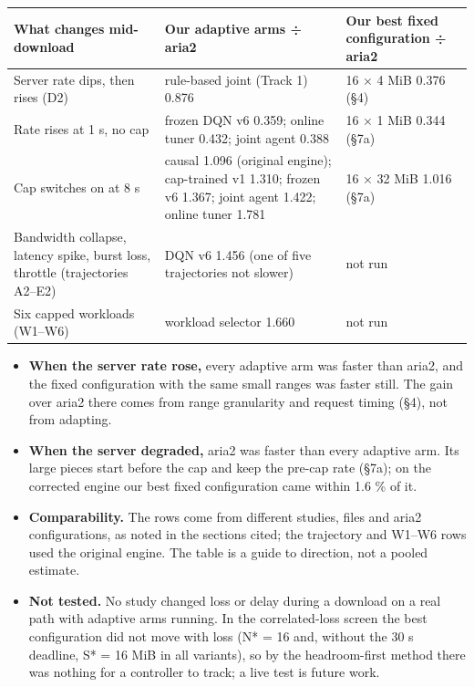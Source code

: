 \documentclass{ieeeaccess}
\begin{document}
\begin{table}[!t]\centering\footnotesize
\begin{tabularx}{\textwidth}{@{}LLL@{}}
\toprule
\textbf{What changes mid-download} & \textbf{Our adaptive arms ÷ aria2} & \textbf{Our best fixed configuration ÷ aria2}\\
\midrule
Server rate dips, then rises (D2) & rule-based joint (Track 1) 0.876 & 16 × 4 MiB 0.376 (§4)\\
Rate rises at 1 s, no cap & frozen DQN v6 0.359; online tuner 0.432; joint agent 0.388 & 16 × 1 MiB 0.344 (§7a)\\
Cap switches on at 8 s & causal 1.096 (original engine); cap-trained v1 1.310; frozen v6 1.367; joint agent 1.422; online tuner 1.781 & 16 × 32 MiB 1.016 (§7a)\\
Bandwidth collapse, latency spike, burst loss, throttle (trajectories A2–E2) & DQN v6 1.456 (one of five trajectories not slower) & not run\\
Six capped workloads (W1–W6) & workload selector 1.660 & not run\\
\bottomrule
\end{tabularx}
\end{table}


\begin{itemize}
\item \textbf{When the server rate rose,} every adaptive arm was faster than aria2, and the fixed configuration with the same small ranges was faster still. The gain over aria2 there comes from range granularity and request timing (§4), not from adapting.
\item \textbf{When the server degraded,} aria2 was faster than every adaptive arm. Its large pieces start before the cap and keep the pre-cap rate (§7a); on the corrected engine our best fixed configuration came within 1.6 \% of it.
\item \textbf{Comparability.} The rows come from different studies, files and aria2 configurations, as noted in the sections cited; the trajectory and W1–W6 rows used the original engine. The table is a guide to direction, not a pooled estimate.
\item \textbf{Not tested.} No study changed loss or delay during a download on a real path with adaptive arms running. In the correlated-loss screen the best configuration did not move with loss (N* = 16 and, without the 30 s deadline, S* = 16 MiB in all variants), so by the headroom-first method there was nothing for a controller to track; a live test is future work.
\end{itemize}
\end{document}
